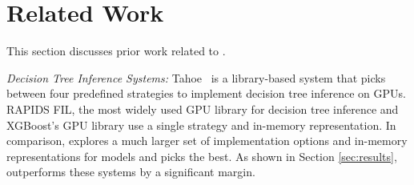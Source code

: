 \section{Related Work}
\label{Sec:Related}
This section discusses prior work related to \Treebeard{}.

\emph{Decision Tree Inference Systems:} 
Tahoe~\cite{Tahoe} is a library-based system that picks 
between four predefined strategies to implement decision tree inference on GPUs.
RAPIDS FIL\cite{FIL}, the most widely used GPU library for decision tree inference
and XGBoost's\cite{XGBoost} GPU library\cite{XGBGPU} 
use a single strategy and in-memory representation.
In comparison, \Treebeard{} explores a much larger set of implementation options and 
in-memory representations for models and picks the best.
As shown in Section \ref{sec:results}, \Treebeard{} outperforms these systems
by a significant margin.

